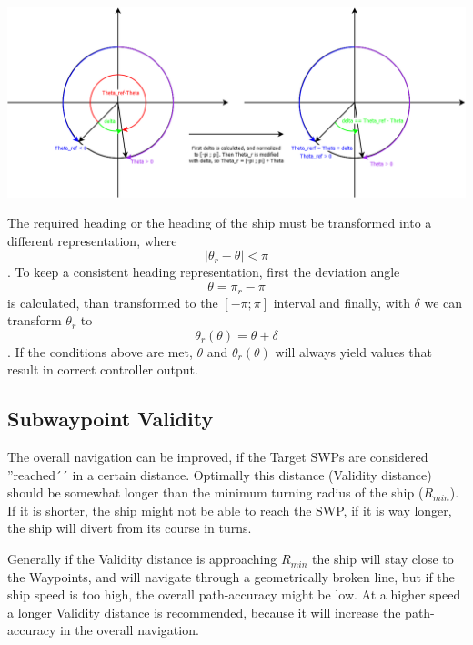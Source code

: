 \includegraphics[width=\textwidth]{img/ControlStrategyFigures/Headings.png}

The required heading or the heading of the ship must be transformed into a different representation, where $$|\theta_{r}-\theta| < \pi$$. To keep a consistent heading representation, first the deviation angle $$\theta = \pi_{r}-\pi$$ is calculated, than transformed to the $[-\pi;\pi]$ interval and finally, with $\delta$ we can transform $\theta_{r}$ to $$\theta_{r}(\theta) = \theta + \delta$$.
If the conditions above are met, $\theta$ and $\theta_r(\theta)$ will always yield values that result in correct controller output.

\subsection{Subwaypoint Validity}

The overall navigation can be improved, if the Target SWPs are considered ''reached´´ in a certain distance. Optimally this distance (Validity distance) should be somewhat longer than the minimum turning radius of the ship ($R_{min}$). If it is shorter, the ship might not be able to reach the SWP, if it is way longer, the ship will divert from its course in turns.

Generally if the Validity distance is approaching $R_{min}$ the ship will stay close to the Waypoints, and will navigate through a geometrically broken line, but if the ship speed is too high, the overall path-accuracy might be low. At a higher speed a longer Validity distance is recommended, because it will increase the path-accuracy in the overall navigation.

